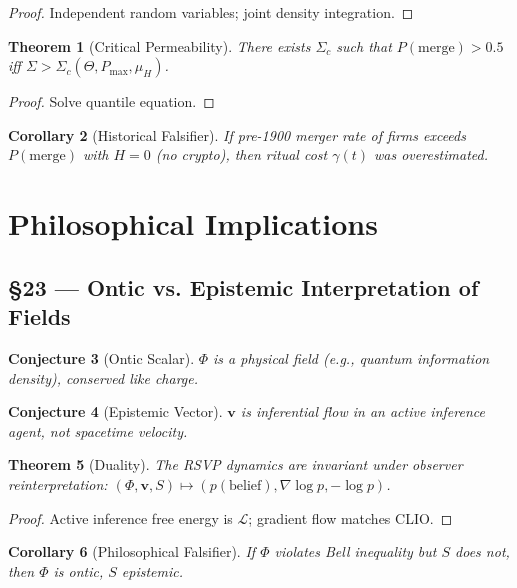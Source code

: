 \documentclass[11pt]{article}
\newtheorem{theorem}{Theorem}[section]
\newtheorem{corollary}[theorem]{Corollary}
\newtheorem{conjecture}[theorem]{Conjecture}
\theoremstyle{definition}
\theoremstyle{remark}
\newcommand{\vect}[1]{\bm{#1}}
\begin{document}
\begin{proof}
Independent random variables; joint density integration.
\end{proof}

\begin{theorem}[Critical Permeability]
There exists $\Sigma_c$ such that $P(\text{merge}) > 0.5$ iff $\Sigma > \Sigma_c(\Theta, P_{\max}, \mu_H)$.
\end{theorem}

\begin{proof}
Solve quantile equation.
\end{proof}

\begin{corollary}[Historical Falsifier]
If pre-1900 merger rate of firms exceeds $P(\text{merge})$ with $H = 0$ (no crypto), then ritual cost $\gamma(t)$ was overestimated.
\end{corollary}

\section{Philosophical Implications}

\subsection*{§23 — Ontic vs. Epistemic Interpretation of Fields}

\begin{conjecture}[Ontic Scalar]
$\Phi$ is a physical field (e.g., quantum information density), conserved like charge.
\end{conjecture}

\begin{conjecture}[Epistemic Vector]
$\vect{v}$ is inferential flow in an active inference agent, not spacetime velocity.
\end{conjecture}

\begin{theorem}[Duality]
The RSVP dynamics are invariant under observer reinterpretation: $(\Phi,\vect{v},S) \mapsto (p(\text{belief}), \nabla \log p, -\log p)$.
\end{theorem}

\begin{proof}
Active inference free energy is $\mathcal{L}$; gradient flow matches CLIO.
\end{proof}

\begin{corollary}[Philosophical Falsifier]
If $\Phi$ violates Bell inequality but $S$ does not, then $\Phi$ is ontic, $S$ epistemic.
\end{corollary}
\end{document}
